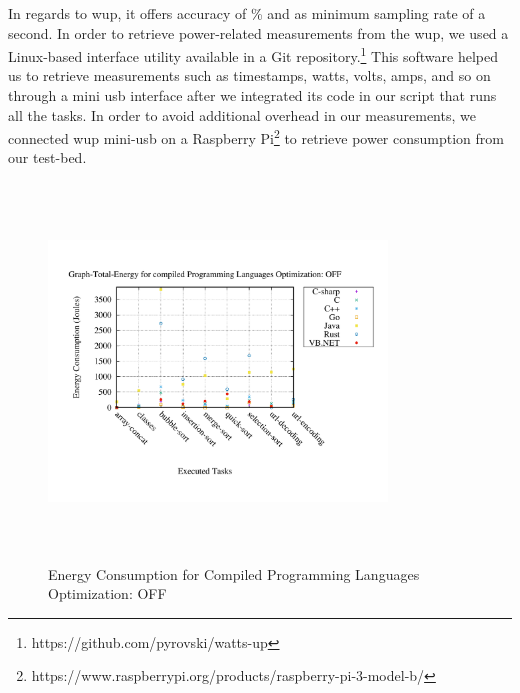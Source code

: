 In regards to {\sc wup}, it offers accuracy of \% and 
as minimum sampling rate of a second. 
In order to retrieve power-related measurements from the {\sc wup}, 
we used a Linux-based interface utility available in a Git 
repository.\footnote{https://github.com/pyrovski/watts-up}
This software helped us to retrieve measurements such as timestamps, 
watts, volts, amps, and so on through a mini {\sc usb} interface after 
we integrated its code in our script that runs all the tasks. 
In order to avoid additional overhead in our measurements, we 
connected {\sc wup} mini-{\sc usb} on a Raspberry Pi\footnote{https://www.raspberrypi.org/products/raspberry-pi-3-model-b/} 
to retrieve power consumption from our test-bed.  

\begin{figure}
	\centering
	\includegraphics[width=9cm,height=10cm,keepaspectratio]{"Graph_Graph-Total-Energy_compiled_Optimization_OFF"}
	\caption{ Energy Consumption for Compiled Programming Languages Optimization: OFF}
	\label{Compiled with No Optimization Total}
\end{figure}

